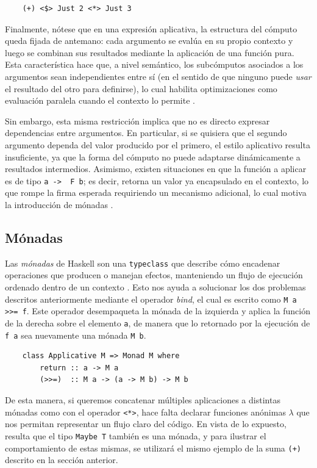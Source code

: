 \begin{verbatim}
    (+) <$> Just 2 <*> Just 3
\end{verbatim}

Finalmente, nótese que en una expresión aplicativa, la estructura del cómputo queda fijada de antemano: cada argumento se evalúa en su propio contexto y luego se combinan sus resultados mediante la aplicación de una función pura. Esta característica hace que, a nivel semántico, los subcómputos asociados a los argumentos sean independientes entre sí (en el sentido de que ninguno puede \emph{usar} el resultado del otro para definirse), lo cual habilita optimizaciones como evaluación paralela cuando el contexto lo permite \cite{McBride2008}.

Sin embargo, esta misma restricción implica que no es directo expresar dependencias entre argumentos. En particular, si se quisiera que el segundo argumento dependa del valor producido por el primero, el estilo aplicativo resulta insuficiente, ya que la forma del cómputo no puede adaptarse dinámicamente a resultados intermedios. Asimismo, existen situaciones en que la función a aplicar es de tipo \texttt{a -> \ F b}; es decir, retorna un valor ya encapsulado en el contexto, lo que rompe la firma esperada requiriendo un mecanismo adicional, lo cual motiva la introducción de mónadas \cite{Wadler1995}.

\subsection{Mónadas}

Las \textit{mónadas} de \textsf{Haskell} son una \verb|typeclass| que describe cómo encadenar operaciones que producen o manejan efectos, manteniendo un flujo de ejecución  ordenado dentro de un contexto \cite{Wadler1995}. Esto nos ayuda a solucionar los dos problemas descritos anteriormente mediante el operador \textit{bind}, el cual es escrito como \verb|M a >>= f|. Este operador desempaqueta la mónada de la izquierda y aplica la función de la derecha sobre el elemento \verb|a|, de manera que lo retornado por la ejecución de \texttt{f a} sea nuevamente una mónada \verb|M b|.

\newpage

\begin{verbatim}
    class Applicative M => Monad M where
        return :: a -> M a
        (>>=)  :: M a -> (a -> M b) -> M b
\end{verbatim}

De esta manera, si queremos concatenar múltiples aplicaciones a distintas mónadas como con el operador \texttt{<*>}, hace falta declarar funciones anónimas $\lambda$ que nos permitan representar un flujo claro del código. En vista de lo expuesto, resulta que el tipo \texttt{Maybe T} también es una mónada, y para ilustrar el comportamiento de estas mismas, se utilizará el mismo ejemplo de la suma \verb|(+)| descrito en la sección anterior.

